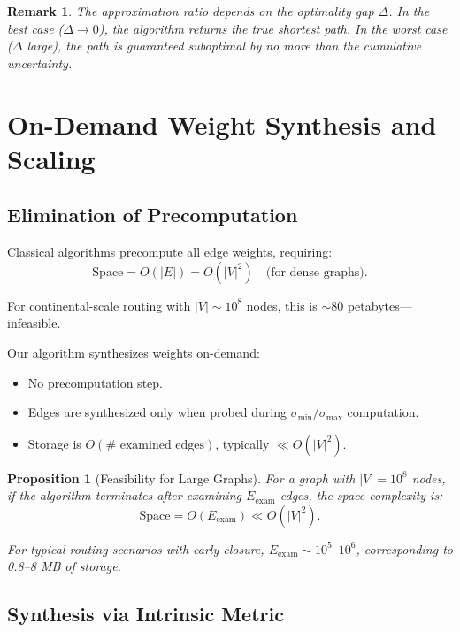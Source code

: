 \documentclass[twocolumn,11pt,a4paper]{article}
\newtheorem{proposition}[theorem]{Proposition}
\newtheorem{remark}[theorem]{Remark}
\theoremstyle{definition}
\begin{document}
\begin{remark}
The approximation ratio depends on the optimality gap $\Delta$. In the best case ($\Delta \to 0$), the algorithm returns the true shortest path. In the worst case ($\Delta$ large), the path is guaranteed suboptimal by no more than the cumulative uncertainty.
\end{remark}

\section{On-Demand Weight Synthesis and Scaling}

\subsection{Elimination of Precomputation}

Classical algorithms precompute all edge weights, requiring:
\begin{equation}
\text{Space} = O(|E|) = O(|V|^2) \quad \text{(for dense graphs)}.
\end{equation}

For continental-scale routing with $|V| \sim 10^8$ nodes, this is $\sim 80$ petabytes---infeasible.

Our algorithm synthesizes weights on-demand:
\begin{itemize}
\item No precomputation step.
\item Edges are synthesized only when probed during $\sigma_{\min}/\sigma_{\max}$ computation.
\item Storage is $O(\# \text{ examined edges})$, typically $\ll O(|V|^2)$.
\end{itemize}

\begin{proposition}[Feasibility for Large Graphs]
\label{prop:scaling}
For a graph with $|V| = 10^8$ nodes, if the algorithm terminates after examining $E_{\text{exam}}$ edges, the space complexity is:
\begin{equation}
\text{Space} = O(E_{\text{exam}}) \ll O(|V|^2).
\end{equation}

For typical routing scenarios with early closure, $E_{\text{exam}} \sim 10^5$--$10^6$, corresponding to 0.8--8 MB of storage.
\end{proposition}

\subsection{Synthesis via Intrinsic Metric}
\end{document}
